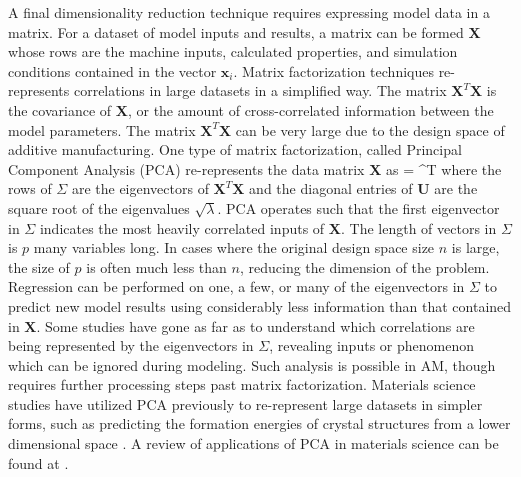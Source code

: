 A final dimensionality reduction technique requires expressing model data in a matrix. For a dataset of model inputs and results, a matrix can be formed $\mathbf{X}$ whose rows are the machine inputs, calculated properties, and simulation conditions contained in the vector $\mathbf{x}_i$. Matrix factorization techniques re-represents correlations in large datasets in a simplified way. The matrix $\mathbf{X}^T\mathbf{X}$ is the covariance of $\mathbf{X}$, or the amount of cross-correlated information between the model parameters. The matrix $\mathbf{X}^T\mathbf{X}$ can be very large due to the design space of additive manufacturing. One type of matrix factorization, called Principal Component Analysis (PCA) re-represents the data matrix $\mathbf{X}$ as
\eqn
	 =  \mathbf{\Sigma}^T
	\label{PCA}
\equ
where the rows of $\Sigma$ are the eigenvectors of $\mathbf{X}^T\mathbf{X}$ and the diagonal entries of $\mathbf{U}$ are the square root of the eigenvalues $\sqrt{\lambda}$. PCA operates such that the first eigenvector in $\Sigma$ indicates the most heavily correlated inputs of $\mathbf{X}$. The length of vectors in $\Sigma$ is $p$ many variables long. In cases where the original design space size $n$ is large, the size of $p$ is often much less than $n$, reducing the dimension of the problem. Regression can be performed on one, a few, or many of the eigenvectors in $\Sigma$ to predict new model results using considerably less information than that contained in $\mathbf{X}$. Some studies have gone as far as to understand which correlations are being represented by the eigenvectors in $\Sigma$, revealing inputs or phenomenon which can be ignored during modeling. Such analysis is possible in AM, though requires further processing steps past matrix factorization. Materials science studies have utilized PCA previously to re-represent large datasets in simpler forms, such as predicting the formation energies of crystal structures from a lower dimensional space \cite{Curtarolo2003}. A review of applications of PCA in materials science can be found at \cite{Rajan2009}.
